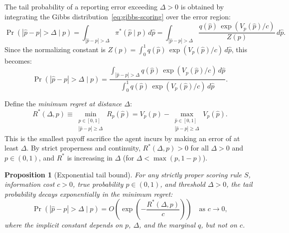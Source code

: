 \documentclass[11pt]{article}
\newtheorem{proposition}{Proposition}
\begin{document}
The tail probability of a reporting error exceeding $\Delta > 0$ is obtained by integrating the Gibbs distribution~\eqref{eq:gibbs-scoring} over the error region:
\[
\Pr(|\hat{p} - p| > \Delta \mid p) = \int_{|\hat{p}-p|>\Delta} \pi^*(\hat{p} \mid p)\,d\hat{p} = \int_{|\hat{p}-p|>\Delta} \frac{q(\hat{p})\,\exp(V_p(\hat{p})/c)}{Z(p)}\,d\hat{p}.
\]
Since the normalizing constant is $Z(p) = \int_0^1 q(\hat{p})\,\exp(V_p(\hat{p})/c)\,d\hat{p}$, this becomes:
\begin{equation}\label{eq:tail-exact-integral}
\Pr(|\hat{p} - p| > \Delta \mid p) = \frac{\int_{|\hat{p}-p|>\Delta} q(\hat{p})\,\exp(V_p(\hat{p})/c)\,d\hat{p}}{\int_0^1 q(\hat{p})\,\exp(V_p(\hat{p})/c)\,d\hat{p}}.
\end{equation}

Define the \emph{minimum regret at distance $\Delta$}:
\begin{equation}\label{eq:min-regret}
R^*(\Delta, p) \equiv \min_{\substack{\hat{p} \in [0,1] \\ |\hat{p} - p| \geq \Delta}} R_p(\hat{p}) = V_p(p) - \max_{\substack{\hat{p} \in [0,1] \\ |\hat{p} - p| \geq \Delta}} V_p(\hat{p}).
\end{equation}
This is the smallest payoff sacrifice the agent incurs by making an error of at least $\Delta$. By strict properness and continuity, $R^*(\Delta, p) > 0$ for all $\Delta > 0$ and $p \in (0,1)$, and $R^*$ is increasing in $\Delta$ (for $\Delta < \max(p, 1-p)$).

\begin{proposition}[Exponential tail bound]\label{prop:tail-bound}
For any strictly proper scoring rule $S$, information cost $c > 0$, true probability $p \in (0,1)$, and threshold $\Delta > 0$, the tail probability decays exponentially in the minimum regret:
\begin{equation}\label{eq:tail-bound}
\Pr(|\hat{p} - p| > \Delta \mid p) = O\!\left(\exp\!\left(-\frac{R^*(\Delta, p)}{c}\right)\right) \quad \text{as } c \to 0,
\end{equation}
where the implicit constant depends on $p$, $\Delta$, and the marginal $q$, but not on $c$.
\end{proposition}
\end{document}
